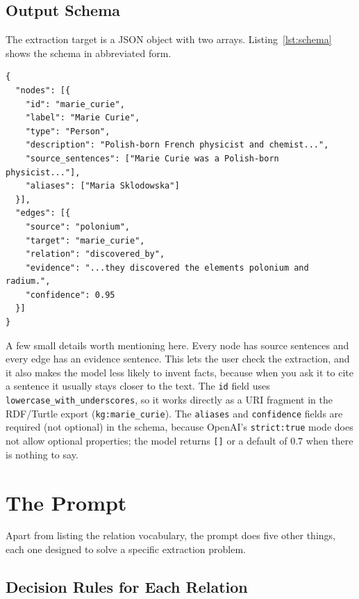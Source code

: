 \documentclass[11pt,a4paper]{article}
\begin{document}
\subsection{Output Schema}

The extraction target is a JSON object with two arrays. Listing~\ref{lst:schema} shows the schema in abbreviated form.

\begin{lstlisting}[label=lst:schema, caption={Output schema (abbreviated). Each node carries its source sentences and any aliases. Each edge carries the verbatim evidence sentence and a confidence value in [0,1].}]
{
  "nodes": [{
    "id": "marie_curie",
    "label": "Marie Curie",
    "type": "Person",
    "description": "Polish-born French physicist and chemist...",
    "source_sentences": ["Marie Curie was a Polish-born physicist..."],
    "aliases": ["Maria Sklodowska"]
  }],
  "edges": [{
    "source": "polonium",
    "target": "marie_curie",
    "relation": "discovered_by",
    "evidence": "...they discovered the elements polonium and radium.",
    "confidence": 0.95
  }]
}
\end{lstlisting}

A few small details worth mentioning here. Every node has source sentences and every edge has an evidence sentence. This lets the user check the extraction, and it also makes the model less likely to invent facts, because when you ask it to cite a sentence it usually stays closer to the text. The \texttt{id} field uses \texttt{lowercase\_with\_underscores}, so it works directly as a URI fragment in the RDF/Turtle export (\texttt{kg:marie\_curie}). The \texttt{aliases} and \texttt{confidence} fields are required (not optional) in the schema, because OpenAI's \texttt{strict:true} mode does not allow optional properties; the model returns \texttt{[]} or a default of $0.7$ when there is nothing to say.

\section{The Prompt}\label{sec:prompt}

Apart from listing the relation vocabulary, the prompt does five other things, each one designed to solve a specific extraction problem.

\subsection{Decision Rules for Each Relation}\label{sec:decision-rules}
\end{document}
